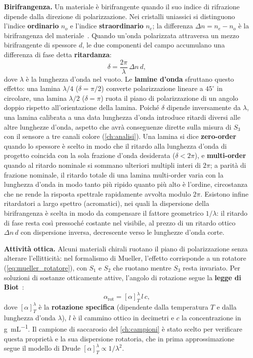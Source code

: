 \textbf{Birifrangenza.} Un materiale è birifrangente quando il suo indice di rifrazione dipende dalla direzione di polarizzazione. Nei cristalli uniassici si distinguono l'indice \textbf{ordinario} $n_o$ e l'indice \textbf{straordinario} $n_e$; la differenza $\Delta n = n_e - n_o$ è la birifrangenza del materiale~\cite{hecht2017optics}. Quando un'onda polarizzata attraversa un mezzo birifrangente di spessore $d$, le due componenti del campo accumulano una differenza di fase detta \textbf{ritardanza}:
\begin{equation}
\label{eq:ritardanza}
\delta = \frac{2\pi}{\lambda}\,\Delta n\, d,
\end{equation}
dove $\lambda$ è la lunghezza d'onda nel vuoto. Le \textbf{lamine d'onda} sfruttano questo effetto: una lamina $\lambda/4$ ($\delta = \pi/2$) converte polarizzazione lineare a $45^\circ$ in circolare, una lamina $\lambda/2$ ($\delta = \pi$) ruota il piano di polarizzazione di un angolo doppio rispetto all'orientazione della lamina. Poiché $\delta$ dipende inversamente da $\lambda$, una lamina calibrata a una data lunghezza d'onda introduce ritardi diversi alle altre lunghezze d'onda, aspetto che avrà conseguenze dirette sulla misura di $S_3$ con il sensore a tre canali colore (\cref{ch:analisi}). Una lamina si dice \textbf{zero-order} quando lo spessore è scelto in modo che il ritardo alla lunghezza d'onda di progetto coincida con la sola frazione d'onda desiderata ($\delta < 2\pi$), e \textbf{multi-order} quando al ritardo nominale si sommano ulteriori multipli interi di $2\pi$; a parità di frazione nominale, il ritardo totale di una lamina multi-order varia con la lunghezza d'onda in modo tanto più ripido quanto più alto è l'ordine, circostanza che ne rende la risposta spettrale rapidamente avvolta modulo $2\pi$. Esistono infine ritardatori a largo spettro (acromatici), nei quali la dispersione della birifrangenza è scelta in modo da compensare il fattore geometrico $1/\lambda$: il ritardo di fase resta così pressoché costante nel visibile, al prezzo di un ritardo ottico $\Delta n\, d$ con dispersione inversa, decrescente verso le lunghezze d'onda corte.

\textbf{Attività ottica.} Alcuni materiali chirali ruotano il piano di polarizzazione senza alterare l'ellitticità: nel formalismo di Mueller, l'effetto corrisponde a un rotatore (\cref{eq:mueller_rotatore}), con $S_1$ e $S_2$ che ruotano mentre $S_3$ resta invariato. Per soluzioni di sostanze otticamente attive, l'angolo di rotazione segue la \textbf{legge di Biot}~\cite{hecht2017optics}:
\begin{equation}
\label{eq:biot}
\alpha_\text{rot} = [\alpha]_T^\lambda \, l \, c,
\end{equation}
dove $[\alpha]_T^\lambda$ è la \textbf{rotazione specifica} (dipendente dalla temperatura $T$ e dalla lunghezza d'onda $\lambda$), $l$ è il cammino ottico in decimetri e $c$ la concentrazione in \si{\gram\per\milli\liter}. Il campione di saccarosio del \cref{ch:campioni} è stato scelto per verificare questa proprietà e la sua dispersione rotatoria, che in prima approssimazione segue il modello di Drude $[\alpha]_T^\lambda \propto 1/\lambda^2$.

